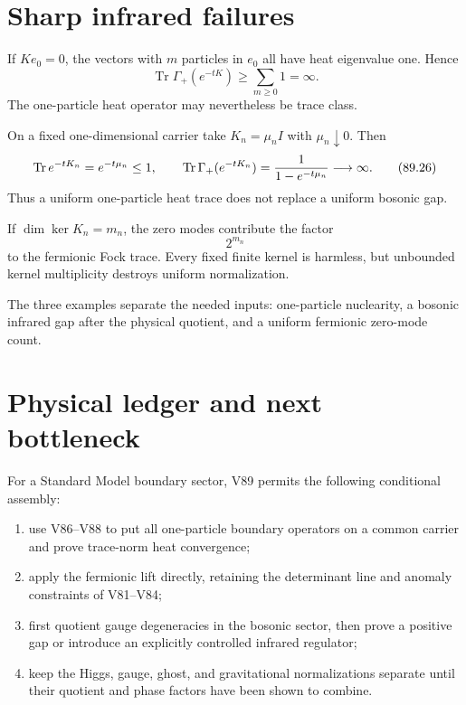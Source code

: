\documentclass[11pt]{article}
\theoremstyle{remark}
\begin{document}
\section{Sharp infrared failures}

\begin{counterexample}
\label{cnt:v15v89-zero}
If \(Ke_0=0\), the vectors with \(m\) particles in \(e_0\) all
have heat eigenvalue one.  Hence
\[
 \operatorname{Tr}\Gamma_+(e^{-tK})\geq\sum_{m\geq0}1=\infty.      \tag{89.25}
\]
The one-particle heat operator may nevertheless be trace class.
\end{counterexample}

\begin{counterexample}
\label{cnt:v15v89-closing}
On a fixed one-dimensional carrier take \(K_n=\mu_n I\) with
\(\mu_n\downarrow0\).  Then
\[
 \operatorname{Tr}e^{-tK_n}=e^{-t\mu_n}\leq1,
 \qquad
 \operatorname{Tr}\Gamma_+(e^{-tK_n})
 ={1\over1-e^{-t\mu_n}}\longrightarrow\infty.         \tag{89.26}
\]
Thus a uniform one-particle heat trace does not replace a uniform
bosonic gap.
\end{counterexample}

\begin{counterexample}
\label{cnt:v15v89-fermion-kernel}
If \(\dim\ker K_n=m_n\), the zero modes contribute the factor
\[
 2^{m_n}                                                     \tag{89.27}
\]
to the fermionic Fock trace.  Every fixed finite kernel is harmless,
but unbounded kernel multiplicity destroys uniform normalization.
\end{counterexample}

The three examples separate the needed inputs: one-particle
nuclearity, a bosonic infrared gap after the physical quotient,
and a uniform fermionic zero-mode count.

\section{Physical ledger and next bottleneck}

For a Standard Model boundary sector, V89 permits the following
conditional assembly:
\begin{enumerate}
\item use V86--V88 to put all one-particle boundary operators on a
      common carrier and prove trace-norm heat convergence;
\item apply the fermionic lift directly, retaining the determinant
      line and anomaly constraints of V81--V84;
\item first quotient gauge degeneracies in the bosonic sector, then
      prove a positive gap or introduce an explicitly controlled
      infrared regulator;
\item keep the Higgs, gauge, ghost, and gravitational normalizations
      separate until their quotient and phase factors have been
      shown to combine.
\end{enumerate}
\end{document}
